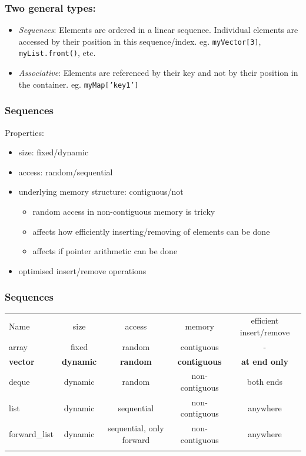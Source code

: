 \subsubsection{Two general types:}\label{two-general-types}

\begin{itemize}
\item
  \emph{Sequences}: Elements are ordered in a linear sequence.
  Individual elements are accessed by their position in this
  sequence/index. eg. \texttt{myVector{[}3{]}}, \texttt{myList.front()},
  etc.
\item
  \emph{Associative}: Elements are referenced by their key and not by
  their position in the container. eg. \texttt{myMap{[}'key1'{]}}
\end{itemize}

\subsubsection{Sequences}\label{sequences}

Properties:

\begin{itemize}
\itemsep1pt\parskip0pt
\item
  size: fixed/dynamic
\item
  access: random/sequential
\item
  underlying memory structure: contiguous/not

  \begin{itemize}
  \itemsep1pt\parskip0pt
  \item
    random access in non-contiguous memory is tricky
  \item
    affects how efficiently inserting/removing of elements can be done
  \item
    affects if pointer arithmetic can be done
  \end{itemize}
\item
  optimised insert/remove operations
\end{itemize}

\subsubsection{Sequences}\label{sequences-1}

\begin{longtable}[c]{@{}lcccc@{}}
\toprule\addlinespace
Name & size & access & memory & efficient insert/remove
\\\addlinespace
\midrule\endhead
array & fixed & random & contiguous & -
\\\addlinespace
\textbf{vector} & \textbf{dynamic} & \textbf{random} &
\textbf{contiguous} & \textbf{at end only}
\\\addlinespace
deque & dynamic & random & non-contiguous & both ends
\\\addlinespace
list & dynamic & sequential & non-contiguous & anywhere
\\\addlinespace
forward\_list & dynamic & sequential, only forward & non-contiguous &
anywhere
\\\addlinespace
\bottomrule
\end{longtable}

